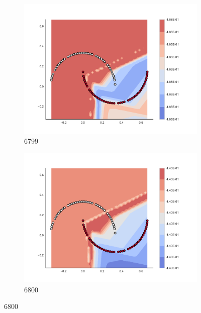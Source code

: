 \begin{figure}[h]
\begin{subfigure}[b]{0.09\textwidth}
    \includegraphics[clip, trim=2.35cm 1.75cm 4.5cm 0cm,width=\textwidth]{img/convergence/6799.pdf}
    \caption{6799}
    \label{fig:convergence_6799}
\end{subfigure}
%
\begin{subfigure}[b]{0.09\textwidth}
    \includegraphics[clip, trim=2.35cm 1.75cm 4.5cm 0cm,width=\textwidth]{img/convergence/6800.pdf}
    \caption{6800}
    \label{fig:convergence_6800}
\end{subfigure}
%
        \end{figure}
